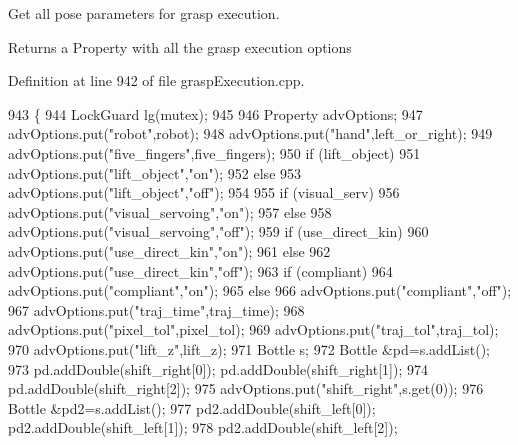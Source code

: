 Get all pose parameters for grasp execution. 

\begin{DoxyReturn}{Returns}
a Property with all the grasp execution options 
\end{DoxyReturn}


Definition at line 942 of file grasp\+Execution.\+cpp.


\begin{DoxyCode}
943 \{
944     LockGuard lg(mutex);
945 
946     Property advOptions;
947     advOptions.put(\textcolor{stringliteral}{"robot"},robot);
948     advOptions.put(\textcolor{stringliteral}{"hand"},left_or_right);
949     advOptions.put(\textcolor{stringliteral}{"five\_fingers"},five\_fingers);
950     \textcolor{keywordflow}{if} (lift_object)
951         advOptions.put(\textcolor{stringliteral}{"lift\_object"},\textcolor{stringliteral}{"on"});
952     \textcolor{keywordflow}{else}
953         advOptions.put(\textcolor{stringliteral}{"lift\_object"},\textcolor{stringliteral}{"off"});
954 
955     \textcolor{keywordflow}{if} (visual_serv)
956         advOptions.put(\textcolor{stringliteral}{"visual\_servoing"},\textcolor{stringliteral}{"on"});
957     \textcolor{keywordflow}{else}
958         advOptions.put(\textcolor{stringliteral}{"visual\_servoing"},\textcolor{stringliteral}{"off"});
959     \textcolor{keywordflow}{if} (use_direct_kin)
960         advOptions.put(\textcolor{stringliteral}{"use\_direct\_kin"},\textcolor{stringliteral}{"on"});
961     \textcolor{keywordflow}{else}
962         advOptions.put(\textcolor{stringliteral}{"use\_direct\_kin"},\textcolor{stringliteral}{"off"});
963     \textcolor{keywordflow}{if} (compliant)
964         advOptions.put(\textcolor{stringliteral}{"compliant"},\textcolor{stringliteral}{"on"});
965     \textcolor{keywordflow}{else}
966         advOptions.put(\textcolor{stringliteral}{"compliant"},\textcolor{stringliteral}{"off"});
967     advOptions.put(\textcolor{stringliteral}{"traj\_time"},traj_time);
968     advOptions.put(\textcolor{stringliteral}{"pixel\_tol"},pixel_tol);
969     advOptions.put(\textcolor{stringliteral}{"traj\_tol"},traj_tol);
970     advOptions.put(\textcolor{stringliteral}{"lift\_z"},lift_z);
971     Bottle s;
972     Bottle &pd=s.addList();
973     pd.addDouble(shift_right[0]); pd.addDouble(shift_right[1]);
974     pd.addDouble(shift_right[2]);
975     advOptions.put(\textcolor{stringliteral}{"shift\_right"},s.get(0));
976     Bottle &pd2=s.addList();
977     pd2.addDouble(shift_left[0]); pd2.addDouble(shift_left[1]);
978     pd2.addDouble(shift_left[2]);

\end{DoxyCode}
